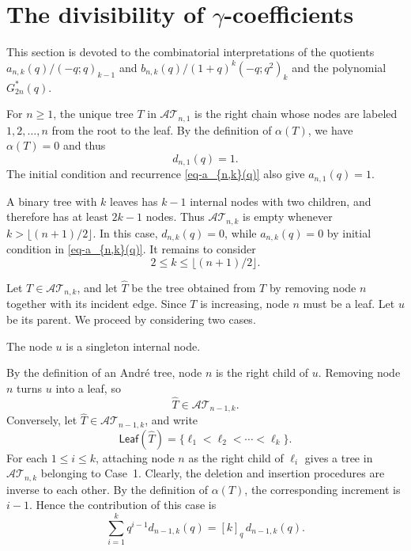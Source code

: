 \documentclass[12pt]{article}
\numberwithin{equation}{section}
\theoremstyle{plain}
\def\Leaf{\mathsf{Leaf}}
\begin{document}
	 				 	\section{The divisibility of $\gamma$-coefficients}
	 				 	This section is devoted to the combinatorial interpretations  of  the quotients 
	 				 	$a_{n,k}(q)/ (-q;q)_{k-1}$ and $b_{n,k}(q)/(1+q)^k(-q; q^2)_k$ and the polynomial $G^*_{2n}(q)$. 
	 				 	
	 				 		For $n\geq1$, the unique tree $T$ in $\mathcal{AT}_{n,1}$ is the
	 				 		right chain whose nodes are labeled $1,2,\ldots,n$ from the root
	 				 		to the leaf. By the definition of $\alpha(T)$, we have $\alpha(T)=0$ and thus 
	 				 		\[
	 				 		d_{n,1}(q)=1.
	 				 		\]
	 				 		The initial condition and recurrence \eqref{eq-a_{n,k}(q)} also give
	 				 		$a_{n,1}(q)=1$.
	 				 		
	 				 		A binary tree with $k$ leaves has $k-1$ internal nodes with two
	 				 		children, and therefore has at least $2k-1$ nodes. Thus
	 				 		$\mathcal{AT}_{n,k}$ is empty whenever
	 				 		$k>\lfloor(n+1)/2\rfloor$. In this case, $d_{n,k}(q)=0$, while
	 				 		$a_{n,k}(q)=0$ by initial condition in
	 				 		\eqref{eq-a_{n,k}(q)}. It remains to consider
	 				 		\[
	 				 		2\leq k\leq\lfloor(n+1)/2\rfloor.
	 				 		\]
	 				 		
	 				 		Let $T\in\mathcal{AT}_{n,k}$, and let $\widehat{T}$ be the tree
	 				 		obtained from $T$ by removing node $n$ together with its incident
	 				 		edge. Since $T$ is increasing, node $n$ must be a leaf. Let $u$
	 				 		be its parent. We proceed by considering two cases.
	 				 		
	 				 		 The node $u$ is a singleton internal node.
	 				 		
	 				 		By the definition of an Andr\'e tree, node $n$ is the right child
	 				 		of $u$. Removing node $n$ turns $u$ into a leaf, so
	 				 		\[
	 				 		\widehat{T}\in\mathcal{AT}_{n-1,k}.
	 				 		\]
	 				 		Conversely, let $\widehat{T}\in\mathcal{AT}_{n-1,k}$, and write
	 				 		\[
	 				 		\Leaf(\widehat{T})
	 				 		=\{\ell_1<\ell_2<\cdots<\ell_k\}.
	 				 		\]
	 				 		For each $1\leq i\leq k$, attaching node $n$ as the right child
	 				 		of $\ell_i$ gives a tree in $\mathcal{AT}_{n,k}$ belonging to
	 				 		Case~1. Clearly, the deletion and insertion procedures are inverse
	 				 		to each other. By the definition of $\alpha(T)$, the corresponding
	 				 		increment is $i-1$. Hence the contribution of this case is
	 				 		\[
	 				 		\sum_{i=1}^{k}q^{i-1}d_{n-1,k}(q)
	 				 		=[k]_q\,d_{n-1,k}(q).
	 				 		\]
	 				 		
\end{document}
